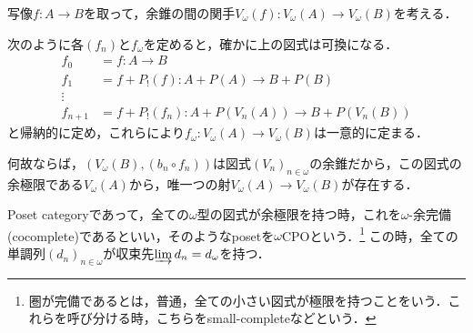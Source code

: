 \documentclass[uplatex, dvipdfmx]{jsarticle}
\begin{document}
\begin{example}
    写像$f:A\to B$を取って，余錐の間の関手$V_\omega(f):V_\omega(A)\to V_\omega(B)$を考える．
    \begin{center}
    \end{center}
    次のように各$(f_n)$と$f_\omega$を定めると，確かに上の図式は可換になる．
    \begin{align*}
        f_0 &= f:A\to B \\
        f_1 &= f+P_!(f) : A+P(A) \to B+P(B) \\
        \vdots &{} \\
        f_{n+1} &= f+P_!(f_n) : A+P(V_n(A)) \to B+P(V_n(B))
    \end{align*}
    と帰納的に定め，これらにより$f_\omega:V_\omega(A)\to V_\omega(B)$は一意的に定まる．

    何故ならば，$(V_\omega(B),(b_n\circ f_n))$は図式$(V_n)_{n\in\omega}$の余錐だから，この図式の余極限である$V_\omega(A)$から，唯一つの射$V_\omega(A)\to V_\omega(B)$が存在する．
\end{example}

\begin{example}
    Poset categoryであって，全ての$\omega$型の図式が余極限を持つ時，これを$\omega$-余完備(cocomplete)であるといい，そのようなposetを$\omega$CPOという．\footnote{圏が完備であるとは，普通，全ての小さい図式が極限を持つことをいう．これらを呼び分ける時，こちらをsmall-completeなどという．}
    この時，全ての単調列$(d_n)_{n\in\omega}$が収束先$\varinjlim d_n=d_\omega$を持つ．
\end{example}
\end{document}
